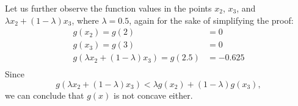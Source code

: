 \begin{enumerate}
Let us further observe the function values in the points $x_2$, $x_3$, and $\lambda x_2 + (1-\lambda) x_3$, where $\lambda = 0.5$, again for the sake of simplifying the proof:
\begin{align*}
g(x_2) = g(2) & = 0 \\
g(x_3) = g(3) & = 0 \\
g(\lambda x_2 + (1-\lambda) x_3) = g(2.5) & = -0.625 \\
\end{align*}
Since 
\[g(\lambda x_2+ (1 - \lambda)x_3) < \lambda g(x_2) + (1-\lambda) g(x_3),\] 
we can conclude that $g(x)$ is not concave either.

\end{enumerate}




